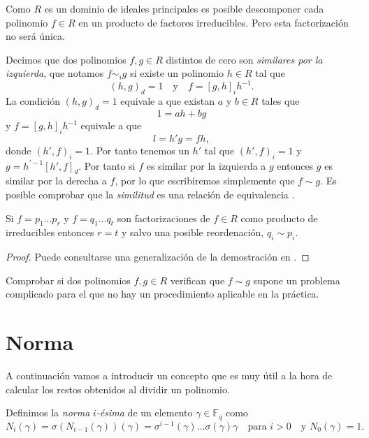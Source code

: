 Como \(R\) es un dominio de ideales principales es posible descomponer cada polinomio \(f \in R\) en un producto de factores irreducibles.
Pero esta factorización no será única.

Decimos que dos polinomios \(f, g \in R\) distintos de cero son \emph{similares por la izquierda}, que notamos \(f \sim_i g\) si existe un polinomio \(h \in R\) tal que 
\[
  (h, g)_d = 1 \quad\text{y}\quad f = [g, h]_ih^{-1}.
\]
La condición \((h, g)_d = 1\) equivale a que existan \(a\) y \(b \in R\) tales que
\[
  1 = ah + bg
\]
y \(f =  [g, h]_ih^{-1}\) equivale a que 
\[
  l = h'g = fh,
\]
donde \((h', f)_i = 1\).
Por tanto tenemos un \(h'\) tal que \((h', f)_i = 1\) y \(g = h^{'-1}[h', f]_d\).
Por tanto si \(f\) es similar por la izquierda a \(g\) entonces \(g\) es similar por la derecha a \(f\), por lo que escribiremos simplemente que \(f \sim g\).
Es posible comprobar que la \emph{similitud} es una relación de equivalencia \parencite[ver][p. 11]{jacobson_finite-dimensional_1996}.


\begin{theorem}
  Si \(f = p_1 \dots p_r\) y \(f = q_1 \dots q_t\) son factorizaciones de \(f \in R\) como producto de irreducibles entonces \(r= t\) y salvo una posible reordenación, \(q_i \sim p_i\).
\end{theorem}

\begin{proof}
  Puede consultarse una generalización de la demostración en \parencite[Teorema 1.2.9]{jacobson_finite-dimensional_1996}.
\end{proof}

Comprobar si dos polinomios \(f, g \in R\) verifican que \(f \sim g\) supone un problema complicado para el que no hay un procedimiento aplicable en la práctica.

\section{Norma}

A continuación vamos a introducir un concepto que es muy útil a la hora de calcular los restos obtenidos al dividir un polinomio.

Definimos la \emph{norma} \(i\)\emph{-ésima} de un elemento \(\gamma \in \mathbb F_q\) como
\[
  N_i(\gamma) = \sigma(N_{i-1}(\gamma))(\gamma) = \sigma^{i-1}(\gamma)\dots \sigma(\gamma)\gamma \quad\text{para } i > 0 \quad\text{y } N_0(\gamma) = 1.
\]

